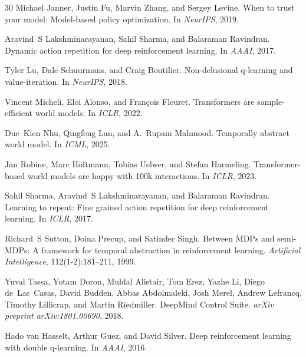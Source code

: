 \documentclass[10pt,letterpaper]{article}
\begin{document}
\begin{thebibliography}{30}
Michael Janner, Justin Fu, Marvin Zhang, and Sergey Levine.
\newblock When to trust your model: Model-based policy optimization.
\newblock In \emph{NeurIPS}, 2019.

Aravind~S Lakshminarayanan, Sahil Sharma, and Balaraman Ravindran.
\newblock Dynamic action repetition for deep reinforcement learning.
\newblock In \emph{AAAI}, 2017.

Tyler Lu, Dale Schuurmans, and Craig Boutilier.
\newblock Non-delusional q-learning and value-iteration.
\newblock In \emph{NeurIPS}, 2018.

Vincent Micheli, Eloi Alonso, and Fran{\c{c}}ois Fleuret.
\newblock Transformers are sample-efficient world models.
\newblock In \emph{ICLR}, 2022.

Duc~Kien Nhu, Qingfeng Lan, and A.~Rupam Mahmood.
\newblock Temporally abstract world model.
\newblock In \emph{ICML}, 2025.

Jan Robine, Marc H{\"o}ftmann, Tobias Uelwer, and Stefan Harmeling.
\newblock Transformer-based world models are happy with 100k interactions.
\newblock In \emph{ICLR}, 2023.

Sahil Sharma, Aravind~S Lakshminarayanan, and Balaraman Ravindran.
\newblock Learning to repeat: Fine grained action repetition for deep reinforcement learning.
\newblock In \emph{ICLR}, 2017.

Richard~S Sutton, Doina Precup, and Satinder Singh.
\newblock Between {MDP}s and semi-{MDP}s: A framework for temporal abstraction in reinforcement learning.
\newblock \emph{Artificial Intelligence}, 112(1-2):181--211, 1999.

Yuval Tassa, Yotam Doron, Muldal Alistair, Tom Erez, Yazhe Li, Diego de~Las~Casas, David Budden, Abbas Abdolmaleki, Josh Merel, Andrew Lefrancq, Timothy Lillicrap, and Martin Riedmiller.
\newblock DeepMind Control Suite.
\newblock \emph{arXiv preprint arXiv:1801.00690}, 2018.

Hado van Hasselt, Arthur Guez, and David Silver.
\newblock Deep reinforcement learning with double q-learning.
\newblock In \emph{AAAI}, 2016.

\end{thebibliography}
\end{document}
